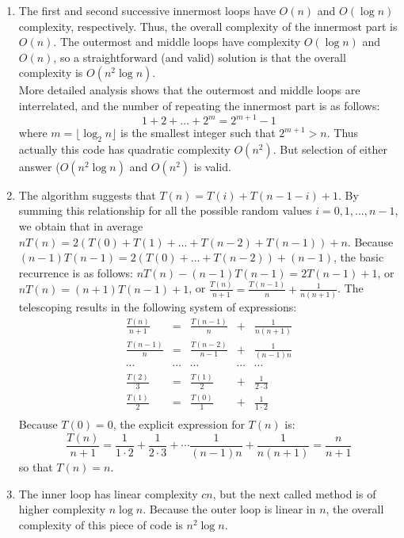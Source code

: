 \documentclass[]{article}
\begin{document}
\begin{enumerate}
\item The first and second successive innermost loops
 have $O(n)$ and $O(\log n)$ complexity, respectively. 
Thus, the overall complexity of the innermost part is
$O(n)$. The outermost and middle loops have complexity
$O(\log n)$ and $O(n)$, so a straightforward (and valid)
solution is that the overall complexity is $O(n^{2}\log n)$.\\

More detailed analysis shows that the outermost and
middle loops are interrelated, and the number of 
repeating the innermost part is as follows:
\[
1 + 2 + \ldots + 2^{m} = 2^{m+1}-1
\]
where $m = \lfloor \log_{2}n \rfloor$ is the smallest
integer such that $2^{m+1} > n$. Thus actually this
code has quadratic complexity $O(n^{2})$. But
selection of either answer
($O(n^{2}\log n)$ and $O(n^{2})$ is valid. 

\item
The algorithm suggests that $T(n) = T(i) + T(n-1-i) + 1$. By summing
this relationship for all the possible random
values $i = 0,1,\ldots,n-1$, we obtain that in average
$nT(n) = 2(T(0)+T(1)+\ldots +T(n-2)+T(n-1)) + n$.
Because $(n-1)T(n-1) = 2(T(0)+\ldots +T(n-2)) + (n-1)$, the
basic recurrence is as follows: $nT(n) - (n-1)T(n-1) = 2T(n-1) +1$,
or $nT(n) = (n+1)T(n-1) +1$, or 
$\frac{T(n)}{n+1} = \frac{T(n-1)}{n} + \frac{1}{n(n+1)}$.
The telescoping results in the following system of expressions:
\[
\begin{array}{lllll}
\frac{T(n)}{n+1} & = & \frac{T(n-1)}{n}  & +  & \frac{1}{n(n+1)}\\
\frac{T(n-1)}{n} & = & \frac{T(n-2)}{n-1}  & +  & \frac{1}{(n-1)n}\\
\cdots & \cdots & \cdots  &  \cdots & \cdots \\
\frac{T(2)}{3} & = & \frac{T(1)}{2}  & + & \frac{1}{2 \cdot 3} \\
\frac{T(1)}{2} & = & \frac{T(0)}{1}  & + & \frac{1}{1 \cdot 2} \\ 
\end{array}
\]
Because $T(0)=0$, the explicit expression for $T(n)$ is:
\[
\frac{T(n)}{n+1} = \frac{1}{1 \cdot 2} + \frac{1}{2 \cdot 3} + \cdots 
\frac{1}{(n-1)n} + \frac{1}{n(n+1)} = \frac{n}{n+1}
\]
so that $T(n)=n$.

\item
The inner loop has linear complexity $cn$, but the
next called method is of higher complexity $n\log n$.
Because the outer loop is linear in $n$, 
the overall complexity of this piece of code is 
$n^{2}\log n$.
\end{enumerate}
\end{document}
